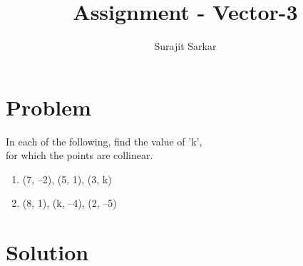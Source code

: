 \documentclass[journal,12pt,twocolumn]{IEEEtran}
\title{\mytitle}
\title{
Assignment - Vector-3
}
\author{Surajit Sarkar}
\begin{document}
\maketitle
\tableofcontents
\bigskip
\section{\textbf{Problem}}
In each of the following, find the value of ’k’,\\ for which the points are collinear.
\begin{enumerate}[label=(\roman*)]
\item (7, –2), (5, 1), (3, k)
\item(8, 1), (k, –4), (2, –5)
\end{enumerate}
\section{\textbf{Solution}}
\fi
\end{document}
